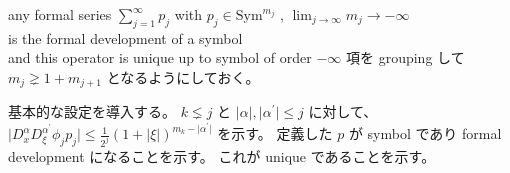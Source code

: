 \begin{Theorem}
\itemprop
  \For any formal series \(\sum_{j=1}^\infty p_j\) with \(p_j \in \text{Sym}^{m_j}\) , \(\lim_{j \to \infty} m_j \to - \infty\) \\
  \Then is the formal development of a symbol \\
  \Then and this operator is unique up to symbol of order \(-\infty\)
\itemnote
  項を grouping して \(m_j \gneq 1 + m_{j+1}\) となるようにしておく。
\end{Theorem}

\begin{Theorem}
\itemprop
  基本的な設定を導入する。
\itemprop
  \(k \lneq j\) と \(\lvert \alpha \rvert , \lvert \alpha^\prime \rvert \leq j\) に対して、 \(\lvert D^\alpha_x D^{\alpha^\prime}_\xi \phi_j p_j \rvert \leq \frac{1}{2^j} (1 + \lvert \xi \rvert)^{m_k - \lvert \alpha^\prime \rvert}\) を示す。
\itemprop
  定義した \(p\) が symbol であり formal development になることを示す。
\itemprop
  これが unique であることを示す。
\end{Theorem}

